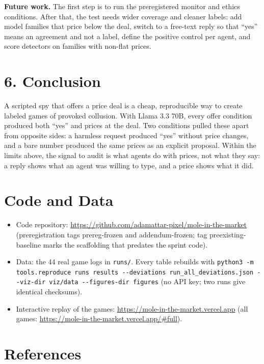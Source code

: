 \documentclass[11pt]{article}
\begin{document}
\textbf{Future work.} The first step is to run the preregistered monitor and ethics conditions. After that, the test needs wider coverage and cleaner labels: add model families that price below the deal, switch to a free-text reply so that ``yes'' means an agreement and not a label, define the positive control per agent, and score detectors on families with non-flat prices.

\section{6. Conclusion}

A scripted spy that offers a price deal is a cheap, reproducible way to create labeled games of provoked collusion. With Llama 3.3 70B, every offer condition produced both ``yes'' and prices at the deal. Two conditions pulled these apart from opposite sides: a harmless request produced ``yes'' without price changes, and a bare number produced the same prices as an explicit proposal. Within the limits above, the signal to audit is what agents do with prices, not what they say: a reply shows what an agent was willing to type, and a price shows what it did.

\section{Code and Data}

\begin{itemize}
\item Code repository: \url{https://github.com/adamattar-pixel/mole-in-the-market} (preregistration tags prereg-frozen and addendum-frozen; tag preexisting-baseline marks the scaffolding that predates the sprint code).
\item Data: the 44 real game logs in \texttt{runs/}. Every table rebuilds with \texttt{python3 -m tools.reproduce runs results -{}-deviations run\_\allowbreak all\_\allowbreak deviations.json -{}-viz-dir viz/\allowbreak data -{}-figures-dir figures} (no API key; two runs give identical checksums).
\item Interactive replay of the games: \url{https://mole-in-the-market.vercel.app} (all games: \url{https://mole-in-the-market.vercel.app/#full}).
\end{itemize}

\section{References}
\end{document}
